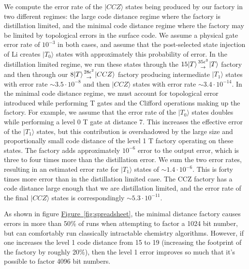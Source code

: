\documentclass[superscriptaddress,notitlepage,longbibliography]{revtex4-1}
\newcommand{\fig}[1]{\hyperref[fig:#1]{Figure~\ref*{fig:#1}}}
\newcommand{\factory}[3]{$#1 \genfrac{}{}{0pt}{}{#2}{\rightarrow} {#3}$ factory}
\begin{document}
We compute the error rate of the $|CCZ\rangle$ states being produced by our factory in two different regimes: the large code distance regime where the factory is distillation limited, and the minimal code distance regime where the factory may be limited by topological errors in the surface code.
We assume a physical gate error rate of $10^{-3}$ in both cases, and assume that the post-selected state injection of Li \cite{li2015} creates $|T_0\rangle$ states with approximately this probability of error.
In the distillation limited regime, we run these states through the \factory{15|T\rangle}{35 \epsilon^3}{|T\rangle} and then through our \factory{8|T\rangle}{28\epsilon^2}{|CCZ\rangle} producing intermediate $|T_1\rangle$ states with error rate $\sim 3.5 \cdot 10^{-8}$ and then $|CCZ\rangle$ states with error rate $\sim 3.4 \cdot 10^{-14}$.
In the minimal code distance regime, we must account for topological error introduced while performing T gates and the Clifford operations making up the factory.
For example, we assume that the error rate of the $|T_0\rangle$ states doubles while performing a level 0 T gate at distance 7.
This increases the effective error of the $|T_1\rangle$ states, but this contribution is overshadowed by the large size and proportionally small code distance of the level 1 T factory operating on these states.
The factory adds approximately $10^{-6}$ error to the output error, which is three to four times more than the distillation error.
We sum the two error rates, resulting in an estimated error rate for $|T_1\rangle$ states of $\sim 1.4 \cdot 10^{-6}$.
This is forty times more error than in the distillation limited case.
The CCZ factory has a code distance large enough that we are distillation limited, and the error rate of the final $|CCZ\rangle$ states is correspondingly $\sim 5.3 \cdot 10^{-11}$.

As shown in figure \fig{spreadsheet}, the minimal distance factory causes errors in more than 50\% of runs when attempting to factor a 1024 bit number, but can comfortably run classically intractable chemistry algorithms.
However, if one increases the level 1 code distance from 15 to 19 (increasing the footprint of the factory by roughly 20\%), then the level 1 error improves so much that it's possible to factor 4096 bit numbers.
\end{document}
